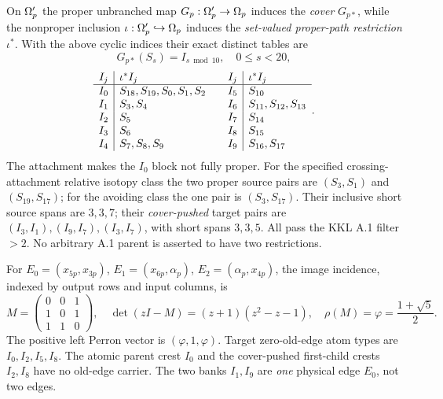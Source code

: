 \begin{theorem}
\label{thm:incidence}
On $\Omega'_p$ the proper unbranched map
$G_p:\Omega'_p\to\Omega_p$ induces the
\emph{cover} $G_{p*}$, while the
nonproper inclusion $\iota:\Omega'_p\hookrightarrow
\Omega_p$ induces the \emph{set-valued proper-path
restriction} $\iota^*$.  With the above cyclic
indices their exact distinct tables are
\begin{equation}\label{eq:cover}
 G_{p*}(S_s)=I_{s\bmod10},\quad 0\le s<20,
\end{equation}
\begin{equation}\label{eq:blocks}
\begin{array}{c|l@{\qquad}c|l}
I_j&\iota^*I_j&I_j&\iota^*I_j\\ \hline
I_0&S_{18},S_{19},S_0,S_1,S_2&
I_5&S_{10}\\
I_1&S_3,S_4&I_6&S_{11},S_{12},S_{13}\\
I_2&S_5&I_7&S_{14}\\
I_3&S_6&I_8&S_{15}\\
I_4&S_7,S_8,S_9&I_9&S_{16},S_{17}
\end{array}.
\end{equation}
The attachment makes the $I_0$ block
not fully proper.  For the specified
crossing-attachment relative isotopy
class the two proper source pairs are
$(S_3,S_1)$ and $(S_{19},S_{17})$;
for the avoiding class the one pair
is $(S_3,S_{17})$.  Their inclusive
short source spans are $3,3,7$;
their \emph{cover-pushed} target
pairs are $(I_3,I_1),(I_9,I_7),(I_3,I_7)$,
with short spans $3,3,5$.
All pass the KKL A.1 filter $>2$.
No arbitrary A.1 parent is asserted
to have two restrictions.

For $E_0=(x_{5p},x_{3p})$,
$E_1=(x_{6p},\alpha_p)$,
$E_2=(\alpha_p,x_{4p})$,
the image incidence, indexed by output
rows and input columns, is
\begin{equation}\label{eq:M}
 M=\begin{pmatrix}0&0&1\\1&0&1\\1&1&0\end{pmatrix},
 \quad\det(zI-M)=(z+1)(z^2-z-1),\quad
 \rho(M)=\varphi=\frac{1+\sqrt5}{2}.
\end{equation}
The positive left Perron vector is
$(\varphi,1,\varphi)$.
Target zero-old-edge atom types are
$I_0,I_2,I_5,I_8$.
The atomic parent crest $I_0$ and
the cover-pushed first-child crests
$I_2,I_8$ have no old-edge carrier.
The two banks $I_1,I_9$ are \emph{one}
physical edge $E_0$, not two edges.
\end{theorem}

